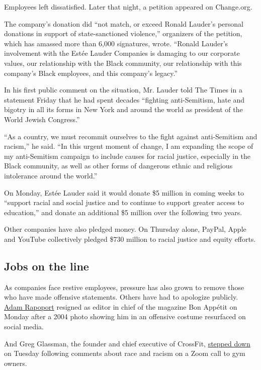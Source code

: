 Employees left dissatisfied. Later that night, a petition appeared on
Change.org.

The company's donation did ``not match, or exceed Ronald Lauder's
personal donations in support of state-sanctioned violence,'' organizers
of the petition, which has amassed more than 6,000 signatures, wrote.
``Ronald Lauder's involvement with the Estée Lauder Companies is
damaging to our corporate values, our relationship with the Black
community, our relationship with this company's Black employees, and
this company's legacy.''

In his first public comment on the situation, Mr. Lauder told The Times
in a statement Friday that he had spent decades ``fighting
anti-Semitism, hate and bigotry in all its forms in New York and around
the world as president of the World Jewish Congress.''

``As a country, we must recommit ourselves to the fight against
anti-Semitism and racism,'' he said. ``In this urgent moment of change,
I am expanding the scope of my anti-Semitism campaign to include causes
for racial justice, especially in the Black community, as well as other
forms of dangerous ethnic and religious intolerance around the world.''

On Monday, Estée Lauder said it would donate \$5 million in coming weeks
to ``support racial and social justice and to continue to support
greater access to education,'' and donate an additional \$5 million over
the following two years.

Other companies have also pledged money. On Thursday alone, PayPal,
Apple and YouTube collectively pledged \$730 million to racial justice
and equity efforts.

\hypertarget{jobs-on-the-line}{%
\subsection{Jobs on the line}\label{jobs-on-the-line}}

As companies face restive employees, pressure has also grown to remove
those who have made offensive statements. Others have had to apologize
publicly.
\href{https://www.nytimes3xbfgragh.onion/2020/06/08/dining/bon-appetit-adam-rapoport.html}{Adam
Rapoport} resigned as editor in chief of the magazine Bon Appétit on
Monday after a 2004 photo showing him in an offensive costume resurfaced
on social media.

And Greg Glassman, the founder and chief executive of CrossFit,
\href{https://www.nytimes3xbfgragh.onion/2020/06/09/style/crossfit-gyms-founder-protests.html}{stepped
down} on Tuesday following comments about race and racism on a Zoom call
to gym owners.

